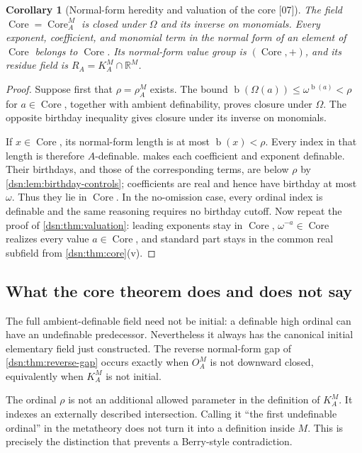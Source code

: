 \documentclass[11pt,a4paper]{article}
\numberwithin{equation}{section}
\newtheorem{corollary}[corollary]{Corollary}
\theoremstyle{definition}
\theoremstyle{remark}
\newcommand{\R}{\mathbb R}
\newcommand{\bd}{\operatorname{b}}
\newcommand{\Core}{\operatorname{Core}}
\newcommand{\src}[1]{\textup{\textsf{\small[#1]}}}
\begin{document}
\begin{corollary}[Normal-form heredity and valuation of the core \src{07}]\label{dsn:cor:core-normal}
The field $\Core=\Core^M_A$ is closed under $\Omega$ and its inverse on
monomials. Every exponent, coefficient, and monomial term in the normal
form of an element of $\Core$ belongs to $\Core$. Its normal-form value
group is $(\Core,+)$, and its residue field is $R_A=K^M_A\cap\R^M$.
\end{corollary}
\begin{proof}
Suppose first that $\rho=\rho^M_A$ exists. The bound
$\bd(\Omega(a))\le\omega^{\bd(a)}<\rho$ for $a\in\Core$, together with
ambient definability, proves closure under $\Omega$. The opposite birthday
inequality gives closure under its inverse on monomials.

If $x\in\Core$, its normal-form length is at most $\bd(x)<\rho$. Every
index in that length is therefore $A$-definable.
 makes each coefficient and exponent
definable. Their birthdays, and those of the corresponding terms, are
below $\rho$ by \cref{dsn:lem:birthday-controls}; coefficients are real and
hence have birthday at most $\omega$. Thus they lie in $\Core$. In the
no-omission case, every ordinal index is definable and the same reasoning
requires no birthday cutoff. Now repeat the proof of
\cref{dsn:thm:valuation}: leading exponents stay in $\Core$,
$\omega^{-a}\in\Core$ realizes every value $a\in\Core$, and standard part
stays in the common real subfield from \cref{dsn:thm:core}(v).
\end{proof}

\subsection{What the core theorem does and does not say}

The full ambient-definable field need not be initial: a definable high
ordinal can have an undefinable predecessor. Nevertheless it always has
the canonical initial elementary field just constructed. The reverse
normal-form gap of \cref{dsn:thm:reverse-gap} occurs exactly when
$O^M_A$ is not downward closed, equivalently when $K^M_A$ is not initial.

The ordinal $\rho$ is not an additional allowed parameter in the
definition of $K^M_A$. It indexes an externally described intersection.
Calling it ``the first undefinable ordinal'' in the metatheory does not
turn it into a definition inside $M$. This is precisely the distinction
that prevents a Berry-style contradiction.
\end{document}
